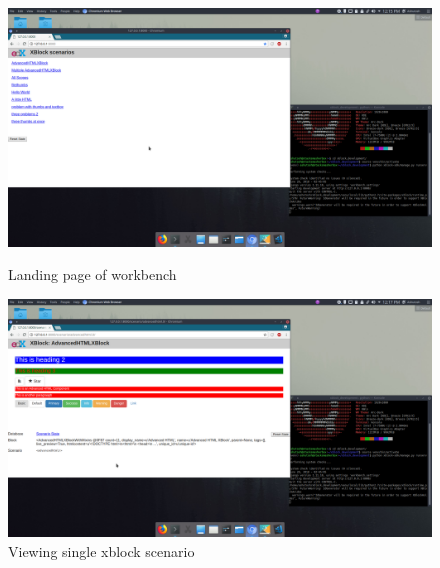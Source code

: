 \begin{figure}[ht]
  \centering
  \includegraphics[width=\textwidth]{images/workbench_0}
  \caption{Landing page of workbench}

  \vspace*{\floatsep}

  \includegraphics[width=\textwidth]{images/workbench_1}
  \caption{Viewing single xblock scenario}
\end{figure}

